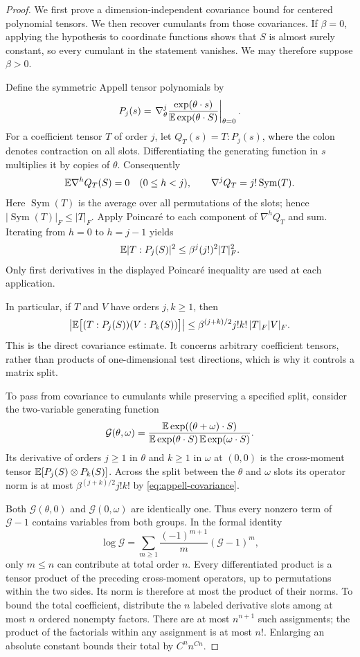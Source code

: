 \begin{proof}
We first prove a dimension-independent covariance bound for centered
polynomial tensors. We then recover cumulants from those covariances.
If $\beta=0$, applying the hypothesis to coordinate functions shows
that $S$ is almost surely constant, so every cumulant in the statement
vanishes. We may therefore suppose $\beta>0$.

Define the symmetric Appell tensor polynomials by
\[
 P_j(s)=
 \left.\nabla_\theta^j
 \frac{\exp(\theta\cdot s)}{\mathbb E\exp(\theta\cdot S)}
 \right|_{\theta=0}.
\]
For a coefficient tensor $T$ of order $j$, let $Q_T(s)=T:P_j(s)$,
where the colon denotes contraction on all slots.  Differentiating the
generating function in $s$ multiplies it by copies of $\theta$.
Consequently
\[
 \mathbb E\nabla^h Q_T(S)=0\quad(0\le h<j),\qquad
 \nabla^j Q_T=j!\operatorname{Sym}(T).
\]
Here $\operatorname{Sym}(T)$ is the average over all permutations of
the slots; hence $|\operatorname{Sym}(T)|_F\le|T|_F$.
Apply Poincar\'e to each component of $\nabla^h Q_T$ and sum.  Iterating
from $h=0$ to $h=j-1$ yields
\begin{equation}
 \mathbb E|T:P_j(S)|^2\le \beta^j(j!)^2|T|_F^2.
 \label{eq:appell-l2}
\end{equation}
Only first derivatives in the displayed Poincar\'e inequality are used at
each application.

In particular, if $T$ and $V$ have orders $j,k\ge1$, then
\begin{equation}\label{eq:appell-covariance}
 \left|\mathbb E\bigl[(T:P_j(S))(V:P_k(S))\bigr]\right|
 \le\beta^{(j+k)/2}j!k!\,|T|_F|V|_F.
\end{equation}
This is the direct covariance estimate. It concerns arbitrary
coefficient tensors, rather than products of one-dimensional test
directions, which is why it controls a matrix split.

To pass from covariance to cumulants while preserving a specified split,
consider the two-variable generating function
\[
 \mathcal G(\theta,\omega)=
 \frac{\mathbb E\exp((\theta+\omega)\cdot S)}
 {\mathbb E\exp(\theta\cdot S)\,\mathbb E\exp(\omega\cdot S)}.
\]
Its derivative of orders $j\ge1$ in $\theta$ and $k\ge1$ in $\omega$
at $(0,0)$ is the cross-moment tensor $\mathbb E[P_j(S)\otimes P_k(S)]$.
Across the split between the $\theta$ and $\omega$ slots its operator
norm is at most $\beta^{(j+k)/2}j!k!$ by
\eqref{eq:appell-covariance}.

Both $\mathcal G(\theta,0)$ and $\mathcal G(0,\omega)$ are identically
one.  Thus every nonzero term of $\mathcal G-1$ contains variables from
both groups.  In the formal identity
\[
 \log\mathcal G
 =\sum_{m\ge1}\frac{(-1)^{m+1}}m(\mathcal G-1)^m,
\]
only $m\le n$ can contribute at total order $n$.  Every differentiated
product is a tensor product of the preceding cross-moment operators,
up to permutations within the two sides.  Its norm is therefore at most
the product of their norms.  To bound the total coefficient, distribute
the $n$ labeled derivative slots among at most $n$ ordered nonempty
factors.  There are at most $n^{n+1}$ such assignments; the product of
the factorials within any assignment is at most $n!$.  Enlarging an
absolute constant bounds their total by $C^n n^{Cn}$.


\end{proof}
